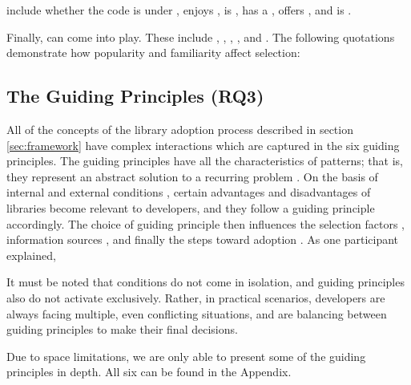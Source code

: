 include whether the code is under , enjoys , is , has a , offers , and is . 

Finally,  can come into play. These include , , , , and . The following quotations demonstrate how popularity and familiarity affect selection:


\subsection{The Guiding Principles (RQ3)}
\label{sec:gp}

All of the concepts of the library adoption process described in section \ref{sec:framework} have complex interactions which are captured in the six guiding principles.  The guiding principles have all the characteristics of patterns; that is, they represent an abstract solution to a recurring problem \cite{riehle:2021:pattern}. On the basis of internal and external conditions , certain advantages and disadvantages of libraries become relevant to developers, and they follow a guiding principle accordingly. The choice of guiding principle then influences the selection factors , information sources , and finally the steps toward adoption . As one participant explained,


It must be noted that conditions do not come in isolation, and guiding principles also do not activate exclusively. Rather, in practical scenarios, developers are always facing multiple, even conflicting situations, and are balancing between guiding principles to make their final decisions.

Due to space limitations, we are only able to present some of the guiding principles in depth. All six can be found in the Appendix.



